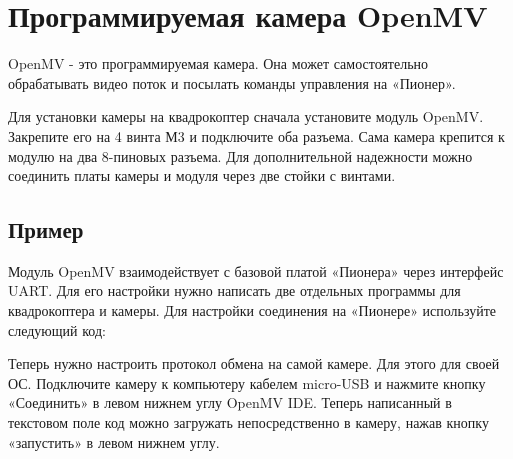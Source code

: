 \documentclass[a4paper,10pt,russian]{sphinxmanual}
\begin{document}
\section{Программируемая камера OpenMV}
\label{\detokenize{module/openMV:openmv}}\label{\detokenize{module/openMV::doc}}

OpenMV - это программируемая камера. Она может самостоятельно обрабатывать видео поток и посылать команды управления на «Пионер».

Для установки камеры на квадрокоптер сначала установите модуль OpenMV. Закрепите его на 4 винта М3 и подключите оба разъема. Сама камера крепится к модулю на два 8-пиновых разъема. Для дополнительной надежности можно соединить платы камеры и модуля через две стойки с винтами.


\subsection{Пример}
\label{\detokenize{module/openMV:id1}}
Модуль OpenMV взаимодействует с базовой платой «Пионера» через интерфейс UART. Для его настройки нужно написать две отдельных программы для квадрокоптера и камеры.
Для настройки соединения на «Пионере» используйте следующий код:

%
\begin{sphinxVerbatim}[commandchars=\\\{\}]
   
        
       
   
   
      
\end{sphinxVerbatim}

Теперь нужно настроить протокол обмена на самой камере. Для этого  для своей ОС. Подключите камеру к компьютеру кабелем micro-USB и нажмите кнопку «Соединить» в левом нижнем углу OpenMV IDE. Теперь написанный в текстовом поле код можно загружать непосредственно в камеру, нажав кнопку «запустить» в левом нижнем углу.
\end{document}
